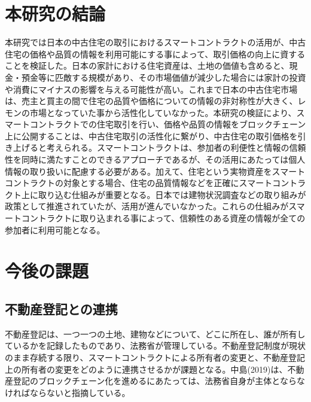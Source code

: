 \documentclass[a4paper,fontsize=11pt,report,notitlepage,line_length=38zw,number_of_lines=40,dvipdfmx]{jlreq}
\begin{document}
\section{本研究の結論}
本研究では日本の中古住宅の取引におけるスマートコントラクトの活用が、中古住宅の価格や品質の情報を利用可能にする事によって、取引価格の向上に資することを検証した。日本の家計における住宅資産は、土地の価値も含めると、現金・預金等に匹敵する規模があり、その市場価値が減少した場合には家計の投資や消費にマイナスの影響を与える可能性が高い。これまで日本の中古住宅市場は、売主と買主の間で住宅の品質や価格についての情報の非対称性が大きく、レモンの市場となっていた事から活性化していなかった。本研究の検証により、スマートコントラクトでの住宅取引を行い、価格や品質の情報をブロックチェーン上に公開することは、中古住宅取引の活性化に繋がり、中古住宅の取引価格を引き上げると考えられる。スマートコントラクトは、参加者の利便性と情報の信頼性を同時に満たすことのできるアプローチであるが、その活用にあたっては個人情報の取り扱いに配慮する必要がある。加えて、住宅という実物資産をスマートコントラクトの対象とする場合、住宅の品質情報などを正確にスマートコントラクト上に取り込む仕組みが重要となる。日本では建物状況調査などの取り組みが政策として推進されていたが、活用が進んでいなかった。これらの仕組みがスマートコントラクトに取り込まれる事によって、信頼性のある資産の情報が全ての参加者に利用可能となる。

\section{今後の課題}
\subsection{不動産登記との連携}
不動産登記は、一つ一つの土地、建物などについて、どこに所在し、誰が所有しているかを記録したものであり、法務省が管理している。不動産登記制度が現状のまま存続する限り、スマートコントラクトによる所有者の変更と、不動産登記上の所有者の変更をどのように連携させるかが課題となる。中島(2019)\cite{nakajima2019}は、不動産登記のブロックチェーン化を進めるにあたっては、法務省自身が主体とならなければならないと指摘している。
\end{document}

